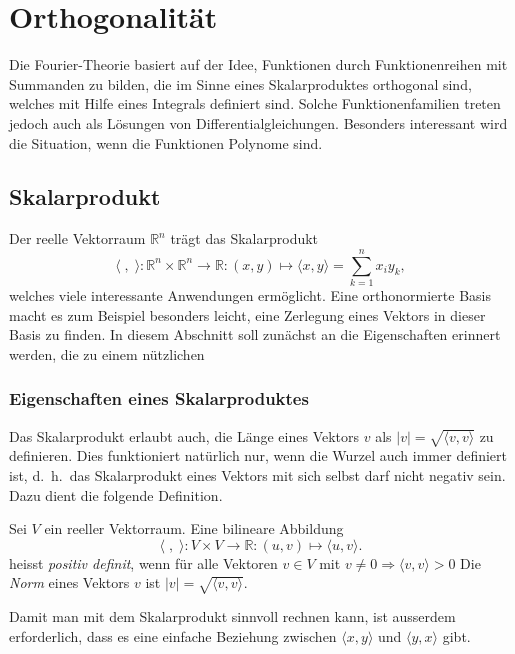 %
%
%
\section{Orthogonalität
\label{buch:integral:section:orthogonale-polynome}}
Die Fourier-Theorie basiert auf der Idee, Funktionen durch 
Funktionenreihen mit Summanden zu bilden, die im Sinne eines
Skalarproduktes orthogonal sind, welches mit Hilfe eines Integrals
definiert sind.
Solche Funktionenfamilien treten jedoch auch als Lösungen von
Differentialgleichungen.
Besonders interessant wird die Situation, wenn die Funktionen 
Polynome sind.

%
%
\subsection{Skalarprodukt}
Der reelle Vektorraum $\mathbb{R}^n$ trägt das Skalarprodukt
\[
\langle\;,\;\rangle
\colon
\mathbb{R}^n \times \mathbb{R}^n \to \mathbb{R}
:
(x,y)\mapsto \langle x, y\rangle = \sum_{k=1}^n x_iy_k,
\]
welches viele interessante Anwendungen ermöglicht.
Eine orthonormierte Basis macht es zum Beispiel besonders leicht,
eine Zerlegung eines Vektors in dieser Basis zu finden.
In diesem Abschnitt soll zunächst an die Eigenschaften erinnert
werden, die zu einem nützlichen 

\subsubsection{Eigenschaften eines Skalarproduktes}
Das Skalarprodukt erlaubt auch, die Länge eines Vektors $v$
als $|v| = \sqrt{\langle v,v\rangle}$ zu definieren.
Dies funktioniert natürlich nur, wenn die Wurzel auch immer
definiert ist, d.~h.~das Skalarprodukt eines Vektors mit sich
selbst darf nicht negativ sein.
Dazu dient die folgende Definition.

\begin{definition}
Sei $V$ ein reeller Vektorraum.
Eine bilineare Abbildung
\[
\langle\;,\;\rangle
\colon
V\times V
\to
\mathbb{R}
:
(u,v) \mapsto \langle u,v\rangle.
\]
heisst {\em positiv definit}, wenn für alle Vektoren $v \in V$ mit
$v\ne 0 \Rightarrow \langle v,v\rangle > 0$ 
Die {\em Norm} eines Vektors $v$ ist
$|v|=\sqrt{\langle v,v\rangle}$.
\end{definition}

Damit man mit dem Skalarprodukt sinnvoll rechnen kann, ist ausserdem
erforderlich, dass es eine einfache Beziehung zwischen 
$\langle x,y\rangle$ und $\langle y,x\rangle$ gibt.

